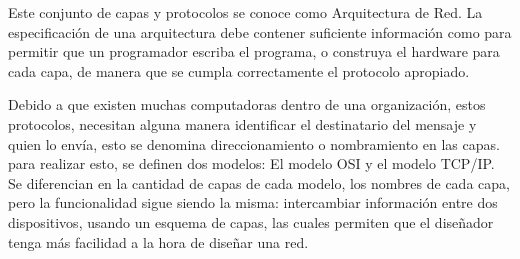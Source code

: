 Este conjunto de capas y protocolos se conoce como Arquitectura de Red. La especificación de una arquitectura debe contener suficiente información como para permitir que un programador escriba el programa, o construya el hardware para cada capa, de manera que se cumpla correctamente el protocolo apropiado.

Debido a que existen muchas computadoras dentro de una organización, estos protocolos, necesitan alguna manera identificar el destinatario del mensaje y quien lo envía, esto se denomina direccionamiento o nombramiento en las capas. para realizar esto, se definen dos modelos: El modelo OSI y el modelo TCP/IP. Se diferencian en la cantidad de capas de cada modelo, los nombres de cada capa, pero la funcionalidad sigue siendo la misma: intercambiar información entre dos dispositivos, usando un esquema de capas, las cuales permiten que el diseñador tenga más facilidad a la hora de diseñar una red. 



